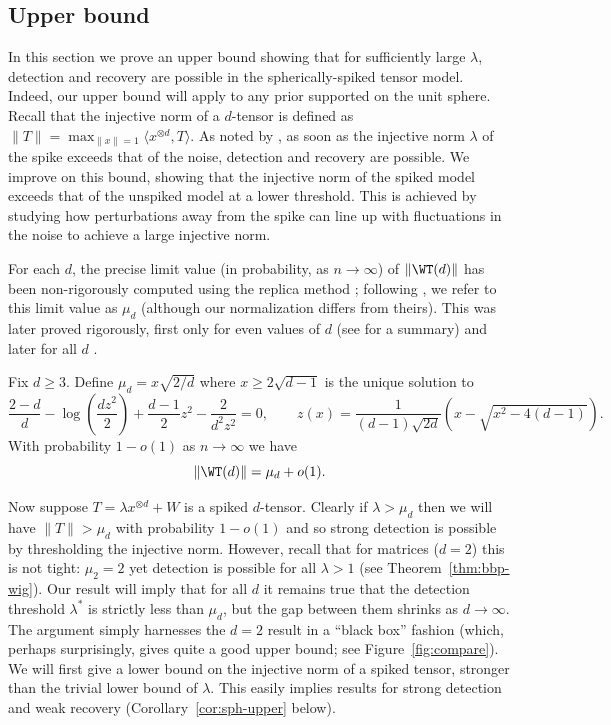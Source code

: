 \documentclass{article}
\begin{document}
\subsection{Upper bound}

In this section we prove an upper bound showing that for sufficiently large $\lambda$, detection and recovery are possible in the spherically-spiked tensor model. Indeed, our upper bound will apply to any prior supported on the unit sphere. Recall that the injective norm of a $d$-tensor is defined as $\|T\| = \max_{\|x\|=1} \langle x^{\otimes d},T \rangle$. As noted by \cite{rm}, as soon as the injective norm $\lambda$ of the spike exceeds that of the noise, detection and recovery are possible. We improve on this bound, showing that the injective norm of the spiked model exceeds that of the unspiked model at a lower threshold. This is achieved by studying how perturbations away from the spike can line up with fluctuations in the noise to achieve a large injective norm.

For each $d$, the precise limit value (in probability, as $n \to \infty$) of $\|\WT(d)\|$ has been non-rigorously computed using the replica method \cite{cs92}; following \cite{rm}, we refer to this limit value as $\mu_d$ (although our normalization differs from theirs). This was later proved rigorously, first only for even values of $d$ \cite{tal06,abac} (see \cite{rm} for a summary) and later for all $d$ \cite{subag-pspin}.

\begin{theorem}
\label{thm:inj-norm}
Fix $d \ge 3$. Define
$\mu_d = x \sqrt{2/d} $ %
where $x \ge 2\sqrt{d-1}$ is the unique solution to
\begin{equation}\frac{2-d}{d} - \log\left(\frac{dz^2}{2}\right) + \frac{d-1}{2} z^2 - \frac{2}{d^2 z^2} = 0, \qquad z(x) = \frac{1}{(d-1)\sqrt{2d}} \left(x - \sqrt{x^2 - 4(d-1)}\right). \label{eq:injective-eq}\end{equation}
With probability $1-o(1)$ as $n\to\infty$ we have
$$\|\WT(d)\| = \mu_d + o(1).$$
\end{theorem}

Now suppose $T = \lambda x^{\otimes d} + W$ is a spiked $d$-tensor. Clearly if $\lambda > \mu_d$ then we will have $\|T\| > \mu_d$ with probability $1-o(1)$ and so strong detection is possible by thresholding the injective norm. However, recall that for matrices ($d=2$) this is not tight: $\mu_2 = 2$ yet detection is possible for all $\lambda > 1$ (see Theorem~\ref{thm:bbp-wig}). Our result will imply that for all $d$ it remains true that the detection threshold $\lambda^*$ is strictly less than $\mu_d$, but the gap between them shrinks as $d \to \infty$. The argument simply harnesses the $d=2$ result in a ``black box'' fashion (which, perhaps surprisingly, gives quite a good upper bound; see Figure~\ref{fig:compare}). We will first give a lower bound on the injective norm of a spiked tensor, stronger than the trivial lower bound of $\lambda$. This easily implies results for strong detection and weak recovery (Corollary~\ref{cor:sph-upper} below).
\end{document}
